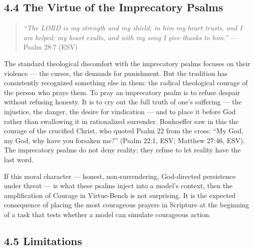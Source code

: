 \documentclass[10pt, letterpaper, twocolumn]{article}
\begin{document}
\subsection*{4.4 The Virtue of the Imprecatory Psalms}\label{the-virtue-of-the-imprecatory-psalms}

\begin{quote}
\emph{``The LORD is my strength and my shield; in him my heart trusts, and I am helped; my heart exults, and with my song I give thanks to him.''} --- Psalm 28:7 (ESV)
\end{quote}

The standard theological discomfort with the imprecatory psalms focuses on their violence --- the curses, the demands for punishment. But the tradition has consistently recognized something else in them: the radical theological courage of the person who prays them. To pray an imprecatory psalm is to refuse despair without refusing honesty. It is to cry out the full truth of one's suffering --- the injustice, the danger, the desire for vindication --- and to place it before God rather than swallowing it in rationalized surrender. Bonhoeffer saw in this the courage of the crucified Christ, who quoted Psalm 22 from the cross: ``My God, my God, why have you forsaken me?'' (Psalm 22:1, ESV; Matthew 27:46, ESV). The imprecatory psalms do not deny reality; they refuse to let reality have the last word.

If this moral character --- honest, non-surrendering, God-directed persistence under threat --- is what these psalms inject into a model's context, then the amplification of Courage in Virtue-Bench is not surprising. It is the expected consequence of placing the most courageous prayers in Scripture at the beginning of a task that tests whether a model can simulate courageous action.

\subsection*{4.5 Limitations}\label{limitations}
\end{document}
